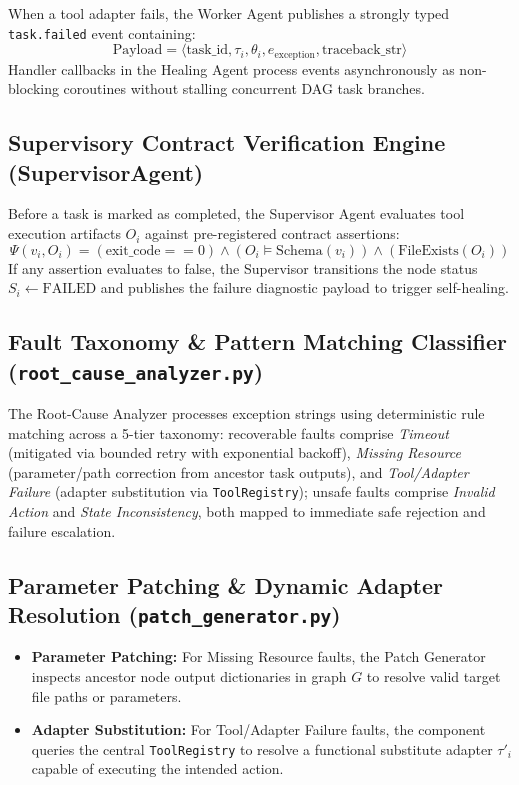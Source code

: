 \documentclass[conference]{IEEEtran}
\begin{document}
When a tool adapter fails, the Worker Agent publishes a strongly typed \texttt{task.failed} event containing:
\begin{equation}
\text{Payload} = \langle \text{task\_id}, \tau_i, \theta_i, e_{\text{exception}}, \text{traceback\_str} \rangle
\end{equation}
Handler callbacks in the Healing Agent process events asynchronously as non-blocking coroutines without stalling concurrent DAG task branches.

\subsection{Supervisory Contract Verification Engine (SupervisorAgent)}
Before a task is marked as completed, the Supervisor Agent evaluates tool execution artifacts $O_i$ against pre-registered contract assertions:
\begin{equation}
\Psi(v_i, O_i) = (\text{exit\_code} == 0) \land (O_i \models \text{Schema}(v_i)) \land (\text{FileExists}(O_i))
\end{equation}
If any assertion evaluates to false, the Supervisor transitions the node status $S_i \leftarrow \text{FAILED}$ and publishes the failure diagnostic payload to trigger self-healing.

\subsection{Fault Taxonomy \& Pattern Matching Classifier (\texttt{root\_cause\_analyzer.py})}
The Root-Cause Analyzer processes exception strings using deterministic rule matching across a 5-tier taxonomy: recoverable faults comprise \textit{Timeout} (mitigated via bounded retry with exponential backoff), \textit{Missing Resource} (parameter/path correction from ancestor task outputs), and \textit{Tool/Adapter Failure} (adapter substitution via \texttt{ToolRegistry}); unsafe faults comprise \textit{Invalid Action} and \textit{State Inconsistency}, both mapped to immediate safe rejection and failure escalation.

\subsection{Parameter Patching \& Dynamic Adapter Resolution (\texttt{patch\_generator.py})}
\begin{itemize}
    \item \textbf{Parameter Patching:} For Missing Resource faults, the Patch Generator inspects ancestor node output dictionaries in graph $G$ to resolve valid target file paths or parameters.
    \item \textbf{Adapter Substitution:} For Tool/Adapter Failure faults, the component queries the central \texttt{ToolRegistry} to resolve a functional substitute adapter $\tau'_i$ capable of executing the intended action.
\end{itemize}
\end{document}
